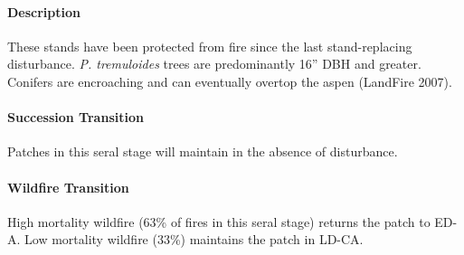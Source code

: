 \paragraph*{Description} These stands have been protected from fire since the last stand-replacing disturbance. \emph{P. tremuloides} trees are predominantly 16'' DBH and greater. Conifers are encroaching and can eventually overtop the aspen (LandFire 2007).

\paragraph*{Succession Transition} Patches in this seral stage will maintain in the absence of disturbance.

\paragraph*{Wildfire Transition} High mortality wildfire (63\% of fires in this seral stage) returns the patch to ED-A. Low mortality wildfire (33\%) maintains the patch in LD-CA.

\noindent\hrulefill




